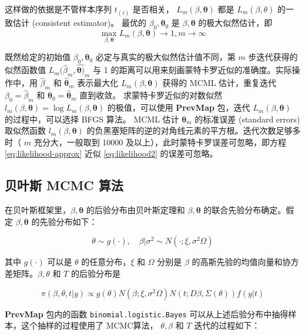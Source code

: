\documentclass[12pt,a4paper,UTF8,twoside]{book}
\theoremstyle{definition}
\theoremstyle{definition}
\theoremstyle{definition}
\theoremstyle{remark}
\begin{document}
\noindent 这样做的依据是不管样本序列 \(t_{(i)}\) 是否相关，
\(L_{m}(\beta,\boldsymbol{\theta})\) 都是 \(L_{m}(\beta,\theta)\)
的一致估计 (consistent estimator)。 最优的
\(\beta_0,\boldsymbol{\theta}_0\) 是 \(\beta,\boldsymbol{\theta}\)
的极大似然估计，即 \[
\max_{\beta,\boldsymbol{\theta}}L_{m}(\beta,\boldsymbol{\theta}) \rightarrow 1, m \rightarrow\infty
\]

\noindent 既然给定的初始值 \(\beta_{0},\boldsymbol{\theta}_{0}\)
必定与真实的极大似然估计值不同，第 \(m\) 步迭代获得的似然函数值
\(L_{m}(\hat{\beta}_{m}, \hat{\boldsymbol{\theta})}_{m}\) 与 1
的距离可以用来刻画蒙特卡罗近似的准确度。实际操作中，用
\(\hat{\beta}_{m}\) 和 \(\hat{\boldsymbol{\theta}}_{m}\) 表示最大化
\(L_{m}(\beta, \boldsymbol{\theta})\) 获得的 MCML 估计，重复迭代
\(\beta_{0} = \hat{\beta}_{m}\) 和
\(\boldsymbol{\theta}_{0} = \hat{\boldsymbol{\theta}}_{m}\) 直到收敛。
求蒙特卡罗近似的对数似然
\(l_{m}(\beta, \boldsymbol{\theta}) = \log L_{m}(\beta, \boldsymbol{\theta})\)
的极值，可以使用 \textbf{PrevMap} 包，迭代
\(L_{m}(\beta, \boldsymbol{\theta})\) 的过程中，可以选择 BFGS 算法。
MCML 估计 \(\boldsymbol{\theta}_{m}\) 的标准误差 (standard errors)
取似然函数 \(l_{m}(\beta,\boldsymbol{\theta})\)
的负黑塞矩阵的逆的对角线元素的平方根。迭代次数足够多时（ \(m\)
充分大，一般取到 10000 及以上），此时蒙特卡罗误差可忽略，即方程
\eqref{eq:likelihood-approx} 近似 \eqref{eq:likelihood2} 的误差可忽略。

\hypertarget{MCMC}{%
\subsection{贝叶斯 MCMC 算法}\label{MCMC}}

在贝叶斯框架里，\(\beta, \boldsymbol{\theta}\) 的后验分布由贝叶斯定理和
\(\beta, \boldsymbol{\theta}\) 的联合先验分布确定。假定
\(\beta, \boldsymbol{\theta}\) 的先验分布如下：

\[
\theta \sim  g(\cdot), \quad \beta | \sigma^2 \sim  N(\cdot; \xi, \sigma^2 \Omega)
\]

\noindent 其中 \(g(\cdot)\) 可以是 \(\theta\) 的任意分布，\(\xi\) 和
\(\Omega\) 分别是 \(\beta\)
的高斯先验的均值向量和协方差矩阵。\(\beta, \theta\) 和 \(T\)
的后验分布是

\begin{equation}
\pi(\beta, \theta, t | y) \propto g(\theta)N(\beta; \xi, \sigma^2 \Omega)N(t; D\beta, \Sigma(\theta))f(y|t) \label{eq:posterior}
\end{equation}

\textbf{PrevMap} 包内的函数 \texttt{binomial.logistic.Bayes}
可以从上述后验分布中抽得样本，这个抽样的过程使用了 MCMC算法，
\(\theta, \beta\) 和 \(T\) 迭代的过程如下：
\end{document}
